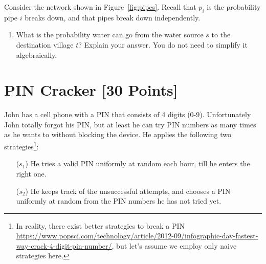 Consider the network shown in Figure~\ref{fig:pipes}. Recall that $p_i$ is the probability pipe $i$ breaks down, and that pipes break down independently. 



\begin{tcolorbox}
	\begin{enumerate}
		\item What is the probability water can go from the water source $s$ to the destination village $t$? Explain your answer. You do not need to simplify it algebraically.
	\end{enumerate}
\end{tcolorbox}


\newpage 

\section{PIN Cracker [30 Points] } 
John has a cell phone with a PIN that consists of 4 digits (0-9). Unfortunately John totally forgot his PIN, but at least he can try PIN numbers as many times as he wants to without blocking the device.  He applies the following two strategies\footnote{In reality, there exist better strategies to break a PIN \url{https://www.popsci.com/technology/article/2012-09/infographic-day-fastest-way-crack-4-digit-pin-number/}, but let's assume we employ only naive strategies here.}:

\begin{itemize}
    \item[($s_1$)] He tries a valid PIN uniformly at random each hour, till he enters the right one.
    \item[($s_2$)] He keeps track of the unsuccessful attempts, and chooses a PIN uniformly at random from the PIN numbers he has not tried yet. 
\end{itemize}

